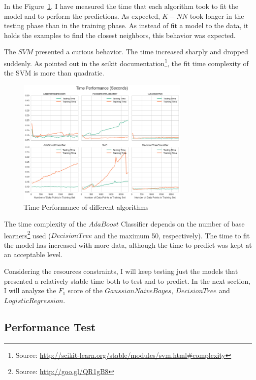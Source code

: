 \documentclass[a4paper]{article}
\begin{document}
In the Figure~\ref{fig:timetest}, I have measured the time that each algorithm took to fit the model and to perform the predictions. As expected, $K-NN$ took longer in the testing phase than in the training phase. As instead of  fit a model to the data, it holds the examples to find the closest neighbors, this behavior was expected. 

The $SVM$ presented a curious behavior. The time increased sharply and dropped suddenly. As pointed out in the scikit documentation\footnote{Source: \url{http://scikit-learn.org/stable/modules/svm.html\#complexity}}, the fit time complexity of the SVM is more than quadratic.

\begin{figure}[ht!]
\centering
\includegraphics[width=0.75\textwidth]{figures/timePerformance.png}
\caption{\label{fig:timetest}Time Performance of different algorithms}
\end{figure}

The time complexity of the $AdaBoost$ Classifier depends on the number of base learners\footnote{Source: \url{http://goo.gl/QR1gB8}} used ($Decision Tree$ and the maximum 50, respectively). The time to fit the model has increased with more data, although the time to predict was kept at an acceptable level.

Considering the resources constraints, I will keep testing just the models that presented a relatively stable time both to test and to predict. In the next section, I will analyze the $F_1$ score of the $Gaussian Naive Bayes$, $Decision Tree$ and $Logistic Regression$.

\subsection{Performance Test}
\end{document}
